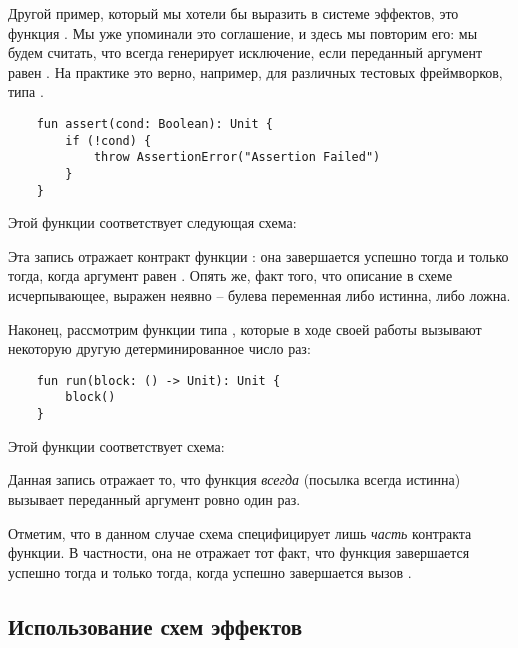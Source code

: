 \bigskip


Другой пример, который мы хотели бы выразить в системе эффектов, это функция . Мы уже упоминали это соглашение, и здесь мы повторим его: мы будем считать, что  всегда генерирует исключение, если переданный аргумент равен . На практике это верно, например, для различных тестовых фреймворков, типа .

\begin{verbatim}
    fun assert(cond: Boolean): Unit {
        if (!cond) {
            throw AssertionError("Assertion Failed")
        }
    }
\end{verbatim}

Этой функции соответствует следующая схема:

{}

Эта запись отражает контракт функции : она завершается успешно тогда и только тогда, когда аргумент равен . Опять же, факт того, что описание в схеме исчерпывающее, выражен неявно -- булева переменная либо истинна, либо ложна.


\bigskip


Наконец, рассмотрим функции типа , которые в ходе своей работы вызывают некоторую другую детерминированное число раз:

\begin{verbatim}
    fun run(block: () -> Unit): Unit {
        block()
    }
\end{verbatim}

Этой функции соответствует схема:

{}

Данная запись отражает то, что функция  \emph{всегда} (посылка  всегда истинна) вызывает переданный аргумент  ровно один раз.

Отметим, что в данном случае схема специфицирует лишь \emph{часть} контракта функции. В частности, она не отражает тот факт, что функция завершается успешно тогда и только тогда, когда успешно завершается вызов .








\subsection{Использование схем эффектов}

